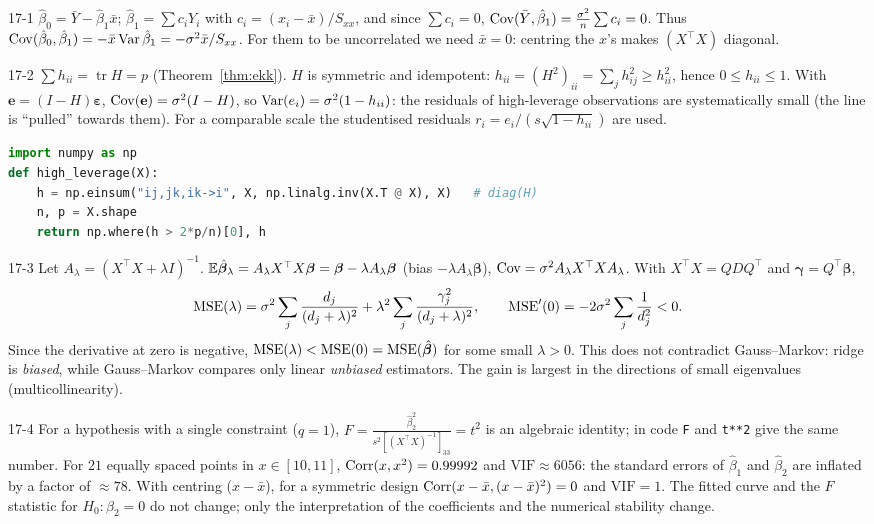 \begin{solution}{17-1}
$\hat\beta_0=\bar Y-\hat\beta_1\bar x$; $\hat\beta_1=\sum c_iY_i$ with $c_i=(x_i-\bar x)/S_{xx}$, and since $\sum c_i=0$, $\operatorname{Cov}(\bar Y,\hat\beta_1)=\frac{\sigma^2}{n}\sum c_i=0$. Thus $\operatorname{Cov}(\hat\beta_0,\hat\beta_1)=-\bar x\operatorname{Var}\hat\beta_1=-\sigma^2\bar x/S_{xx}$. For them to be uncorrelated we need $\bar x=0$: centring the $x$'s makes $(X^\top X)$ diagonal.
\end{solution}

\begin{solution}{17-2}
$\sum h_{ii}=\operatorname{tr}H=p$ (Theorem~\ref{thm:ekk}). $H$ is symmetric and idempotent: $h_{ii}=(H^2)_{ii}=\sum_jh_{ij}^2\ge h_{ii}^2$, hence $0\le h_{ii}\le1$. With $\mathbf e=(I-H)\bm\varepsilon$, $\operatorname{Cov}(\mathbf e)=\sigma^2(I-H)$, so $\operatorname{Var}(e_i)=\sigma^2(1-h_{ii})$: the residuals of high-leverage observations are systematically small (the line is ``pulled'' towards them). For a comparable scale the studentised residuals $r_i=e_i/(s\sqrt{1-h_{ii}})$ are used.
\begin{lstlisting}[language=Python]
import numpy as np
def high_leverage(X):
    h = np.einsum("ij,jk,ik->i", X, np.linalg.inv(X.T @ X), X)   # diag(H)
    n, p = X.shape
    return np.where(h > 2*p/n)[0], h
\end{lstlisting}
\end{solution}

\begin{solution}{17-3}
Let $A_\lambda=(X^\top X+\lambda I)^{-1}$. $\mathbb{E}\hat{\bm\beta}_\lambda=A_\lambda X^\top X\bm\beta=\bm\beta-\lambda A_\lambda\bm\beta$ (bias $-\lambda A_\lambda\bm\beta$), $\operatorname{Cov}=\sigma^2A_\lambda X^\top XA_\lambda$. With $X^\top X=QDQ^\top$ and $\bm\gamma=Q^\top\bm\beta$,
\[
\operatorname{MSE}(\lambda)=\sigma^2\sum_j\frac{d_j}{(d_j+\lambda)^2}+\lambda^2\sum_j\frac{\gamma_j^2}{(d_j+\lambda)^2},\qquad
\operatorname{MSE}'(0)=-2\sigma^2\sum_j\frac{1}{d_j^2}<0 .
\]
Since the derivative at zero is negative, $\operatorname{MSE}(\lambda)<\operatorname{MSE}(0)=\operatorname{MSE}(\hat{\bm\beta})$ for some small $\lambda>0$. This does not contradict Gauss--Markov: ridge is \emph{biased}, while Gauss--Markov compares only linear \emph{unbiased} estimators. The gain is largest in the directions of small eigenvalues (multicollinearity).
\end{solution}

\begin{solution}{17-4}
For a hypothesis with a single constraint ($q=1$), $F=\frac{\hat\beta_2^2}{s^2[(X^\top X)^{-1}]_{33}}=t^2$ is an algebraic identity; in code \texttt{F} and \texttt{t**2} give the same number. For $21$ equally spaced points in $x\in[10,11]$, $\operatorname{Corr}(x,x^2)=0.99992$ and $\mathrm{VIF}\approx6056$: the standard errors of $\hat\beta_1$ and $\hat\beta_2$ are inflated by a factor of $\approx78$. With centring ($x-\bar x$), for a symmetric design $\operatorname{Corr}(x-\bar x,(x-\bar x)^2)=0$ and $\mathrm{VIF}=1$. The fitted curve and the $F$ statistic for $H_0:\beta_2=0$ do not change; only the interpretation of the coefficients and the numerical stability change.
\end{solution}

